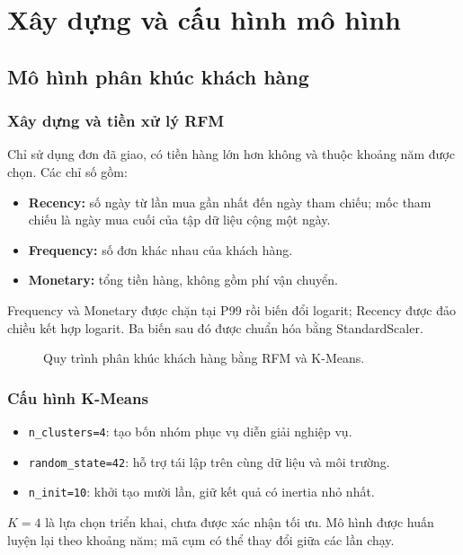 \documentclass[a4paper]{article}
\begin{document}
\section{Xây dựng và cấu hình mô hình}
\subsection{Mô hình phân khúc khách hàng}
\subsubsection{Xây dựng và tiền xử lý RFM}
Chỉ sử dụng đơn đã giao, có tiền hàng lớn hơn không và thuộc khoảng năm được chọn. Các chỉ số gồm:
\begin{itemize}
    \item \textbf{Recency:} số ngày từ lần mua gần nhất đến ngày tham chiếu; mốc tham chiếu là ngày mua cuối của tập dữ liệu cộng một ngày.
    \item \textbf{Frequency:} số đơn khác nhau của khách hàng.
    \item \textbf{Monetary:} tổng tiền hàng, không gồm phí vận chuyển.
\end{itemize}
Frequency và Monetary được chặn tại P99 rồi biến đổi logarit; Recency được đảo chiều kết hợp logarit. Ba biến sau đó được chuẩn hóa bằng StandardScaler.

\begin{figure}[htbp]
\centering
{}
\caption{Quy trình phân khúc khách hàng bằng RFM và K-Means.}
\label{fig:rfm-process}
\end{figure}

\subsubsection{Cấu hình K-Means}
\begin{itemize}
    \item \texttt{n\_clusters=4}: tạo bốn nhóm phục vụ diễn giải nghiệp vụ.
    \item \texttt{random\_state=42}: hỗ trợ tái lập trên cùng dữ liệu và môi trường.
    \item \texttt{n\_init=10}: khởi tạo mười lần, giữ kết quả có inertia nhỏ nhất.
\end{itemize}
$K=4$ là lựa chọn triển khai, chưa được xác nhận tối ưu. Mô hình được huấn luyện lại theo khoảng năm; mã cụm có thể thay đổi giữa các lần chạy.
\end{document}
